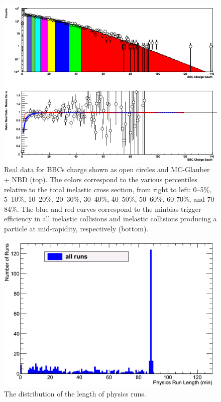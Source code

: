 \begin{figure}[!h]
\begin{center}
\includegraphics[width=0.65\linewidth]{figs/centrality_determination.png}
\caption{Real data for BBCs charge shown as open circles and MC-Glauber + NBD (top). The colors correspond to the various percentiles relative to the total inelastic \pau cross section, from right to left: 0--5$\%$, 5--10\%, 10--20\%, 20--30\%, 30--40\%, 40--50\%, 50--60\%, 60-70\%, and 70-84\%. The blue and red curves correspond to the minbias trigger efficiency in all inelastic collisions and inelastic collisions producing a particle at mid-rapidity, respectively (bottom).}
\label{fig:cent_determination_plot}
\end{center}
\end{figure}


\iffalse

\begin{figure}[!h]
\begin{center}
\includegraphics[width=0.65\linewidth]{figs/hruntime.png}
\caption{The distribution of the length of physics runs.}
\end{center}
\end{figure}

